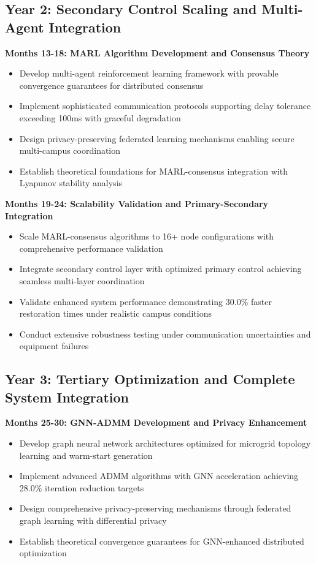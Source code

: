 \documentclass[12pt]{article}
\begin{document}
\subsection{Year 2: Secondary Control Scaling and Multi-Agent Integration}

\textbf{Months 13-18: MARL Algorithm Development and Consensus Theory}
\begin{itemize}
\item Develop multi-agent reinforcement learning framework with provable convergence guarantees for distributed consensus
\item Implement sophisticated communication protocols supporting delay tolerance exceeding 100ms with graceful degradation
\item Design privacy-preserving federated learning mechanisms enabling secure multi-campus coordination
\item Establish theoretical foundations for MARL-consensus integration with Lyapunov stability analysis
\end{itemize}

\textbf{Months 19-24: Scalability Validation and Primary-Secondary Integration}
\begin{itemize}
\item Scale MARL-consensus algorithms to 16+ node configurations with comprehensive performance validation
\item Integrate secondary control layer with optimized primary control achieving seamless multi-layer coordination
\item Validate enhanced system performance demonstrating 30.0\% faster restoration times under realistic campus conditions
\item Conduct extensive robustness testing under communication uncertainties and equipment failures
\end{itemize}

\subsection{Year 3: Tertiary Optimization and Complete System Integration}

\textbf{Months 25-30: GNN-ADMM Development and Privacy Enhancement}
\begin{itemize}
\item Develop graph neural network architectures optimized for microgrid topology learning and warm-start generation
\item Implement advanced ADMM algorithms with GNN acceleration achieving 28.0\% iteration reduction targets
\item Design comprehensive privacy-preserving mechanisms through federated graph learning with differential privacy
\item Establish theoretical convergence guarantees for GNN-enhanced distributed optimization
\end{itemize}
\end{document}

